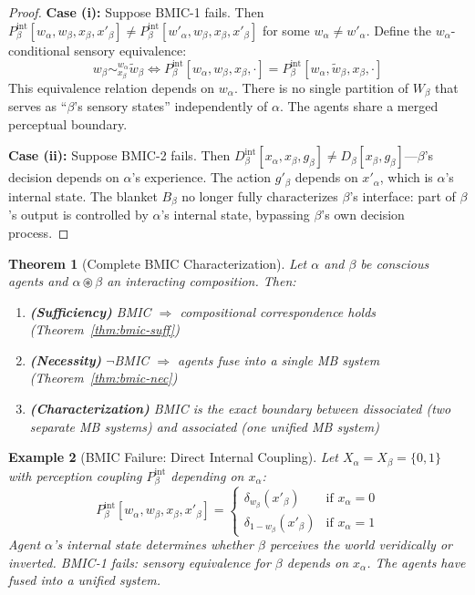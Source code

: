 \documentclass[11pt,a4paper]{article}
\newtheorem{theorem}{Theorem}[section]
\newtheorem{example}[theorem]{Example}
\begin{document}
\begin{proof}
\textbf{Case (i):} Suppose BMIC-1 fails. Then $P^{\text{int}}_\beta[w_\alpha, w_\beta, x_\beta, x'_\beta] \neq P^{\text{int}}_\beta[w'_\alpha, w_\beta, x_\beta, x'_\beta]$ for some $w_\alpha \neq w'_\alpha$. Define the $w_\alpha$-conditional sensory equivalence:
\[
w_\beta \sim^{w_\alpha}_{x_\beta} \tilde{w}_\beta \iff P^{\text{int}}_\beta[w_\alpha, w_\beta, x_\beta, \cdot] = P^{\text{int}}_\beta[w_\alpha, \tilde{w}_\beta, x_\beta, \cdot]
\]
This equivalence relation depends on $w_\alpha$. There is no single partition of $W_\beta$ that serves as ``$\beta$'s sensory states'' independently of $\alpha$. The agents share a merged perceptual boundary.

\textbf{Case (ii):} Suppose BMIC-2 fails. Then $D^{\text{int}}_\beta[x_\alpha, x_\beta, g_\beta] \neq D_\beta[x_\beta, g_\beta]$---$\beta$'s decision depends on $\alpha$'s experience. The action $g'_\beta$ depends on $x'_\alpha$, which is $\alpha$'s internal state. The blanket $B_\beta$ no longer fully characterizes $\beta$'s interface: part of $\beta$'s output is controlled by $\alpha$'s internal state, bypassing $\beta$'s own decision process.
\end{proof}

\begin{theorem}[Complete BMIC Characterization]\label{thm:bmic-char}
Let $\alpha$ and $\beta$ be conscious agents and $\alpha \circledast \beta$ an interacting composition. Then:
\begin{enumerate}[nosep]
    \item \textbf{(Sufficiency)} BMIC $\Rightarrow$ compositional correspondence holds (Theorem~\ref{thm:bmic-suff})
    \item \textbf{(Necessity)} $\neg$BMIC $\Rightarrow$ agents fuse into a single MB system (Theorem~\ref{thm:bmic-nec})
    \item \textbf{(Characterization)} BMIC is the exact boundary between dissociated (two separate MB systems) and associated (one unified MB system)
\end{enumerate}
\end{theorem}

\begin{example}[BMIC Failure: Direct Internal Coupling]\label{ex:bmic-fail}
Let $X_\alpha = X_\beta = \{0, 1\}$ with perception coupling $P^{\text{int}}_\beta$ depending on $x_\alpha$:
\[
P^{\text{int}}_\beta[w_\alpha, w_\beta, x_\beta, x'_\beta] = \begin{cases} \delta_{w_\beta}(x'_\beta) & \text{if } x_\alpha = 0 \\ \delta_{1-w_\beta}(x'_\beta) & \text{if } x_\alpha = 1 \end{cases}
\]
Agent $\alpha$'s internal state determines whether $\beta$ perceives the world veridically or inverted. BMIC-1 fails: sensory equivalence for $\beta$ depends on $x_\alpha$. The agents have fused into a unified system.
\end{example}
\end{document}
